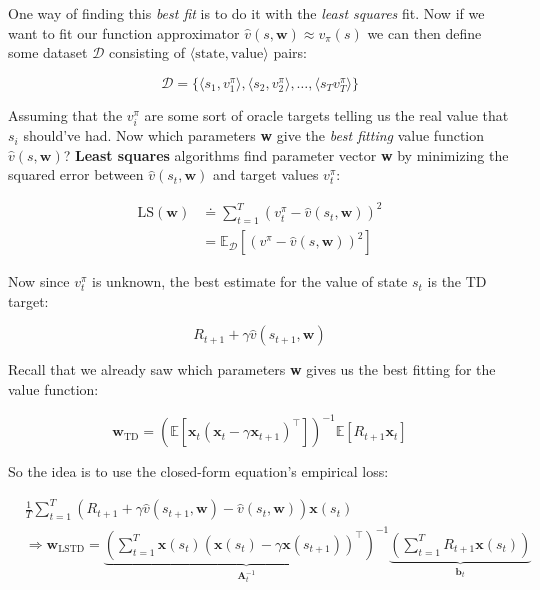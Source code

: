 One way of finding this \emph{best fit} is to do it with the \emph{least squares} fit. Now if we want to fit our function approximator $\hat{v}(s, \mathbf{w}) \approx v_\pi(s)$ we can then define some dataset $\mathcal{D}$ consisting of $\langle \text{state}, \text{value}\rangle$ pairs:

\[
    \mathcal{D} = \{ \langle s_1, v_1^\pi \rangle, \langle s_2, v_2^\pi \rangle, \dots, \langle s_T v_T^\pi \rangle \}
\]

Assuming that the $v_i^\pi$ are some sort of oracle targets telling us the real value that $s_i$ should've had. Now which parameters \textbf{w} give the \emph{best fitting} value function $\hat{v}(s,\mathbf{w})$? \textbf{Least squares} algorithms find parameter vector \textbf{w} by minimizing the squared error between $\hat{v}(s_t, \mathbf{w})$ and target values $v_t^\pi$:

\begin{align*}
    \text{LS}(\mathbf{w}) &\doteq \sum_{t=1}^{T} (v_t^\pi - \hat{v}(s_t, \mathbf{w}))^2 \\
                          &= \mathbb{E}_{\mathcal{D}} [(v^\pi - \hat{v}(s,\mathbf{w}))^2]
\end{align*}

Now since $v_t^\pi$ is unknown, the best estimate for the value of state $s_t$ is the TD target:

\[
    R_{t+1} + \gamma \hat{v}(s_{t+1}, \mathbf{w})
\]

Recall that we already saw which parameters \textbf{w} gives us the best fitting for the value function:

\[
    \mathbf{w}_{\text{TD}} = \left( \mathbb{E}\left[ \mathbf{x}_t \left(\mathbf{x}_t - \gamma \mathbf{x}_{t+1}\right)^\top \right] \right)^{-1} \mathbb{E}\left[ R_{t+1}\mathbf{x}_t \right]
\]

So the idea is to use the closed-form equation's empirical loss:

\begin{align*}
    &\frac{1}{T} \sum_{t=1}^{T} \left( R_{t+1} + \gamma \hat{v}(s_{t+1}, \mathbf{w})  - \hat{v}(s_t, \mathbf{w}) \right) \mathbf{x}(s_t) \\
    &\Rightarrow \mathbf{w}_{\text{LSTD}} = \underbrace{\left( \sum_{t=1}^{T} \mathbf{x}(s_t) (\mathbf{x}(s_t) - \gamma \mathbf{x}(s_{t+1}))^\top \right)^{-1}}_{\mathbf{A}_t^{-1}} \underbrace{\left( \sum_{t=1}^{T} R_{t+1} \mathbf{x}(s_t) \right)}_{\mathbf{b}_t}
\end{align*}

